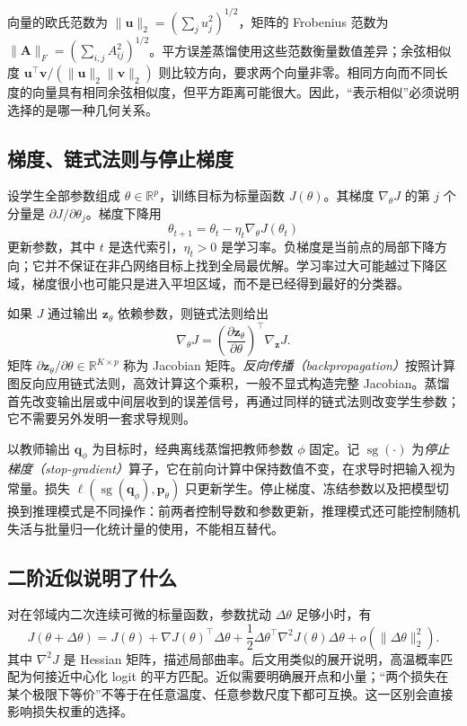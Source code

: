 \documentclass[UTF8,12pt,a4paper,fontset=fandol]{ctexart}
\begin{document}
向量的欧氏范数为 $\|\mathbf u\|_2=(\sum_j u_j^2)^{1/2}$，矩阵的 Frobenius 范数为 $\|\mathbf A\|_F=(\sum_{i,j}A_{ij}^2)^{1/2}$。平方误差蒸馏使用这些范数衡量数值差异；余弦相似度 $\mathbf u^\top\mathbf v/(\|\mathbf u\|_2\|\mathbf v\|_2)$ 则比较方向，要求两个向量非零。相同方向而不同长度的向量具有相同余弦相似度，但平方距离可能很大。因此，“表示相似”必须说明选择的是哪一种几何关系。

\subsection{梯度、链式法则与停止梯度}
设学生全部参数组成 $\theta\in\mathbb R^p$，训练目标为标量函数 $J(\theta)$。其梯度 $\nabla_\theta J$ 的第 $j$ 个分量是 $\partial J/\partial\theta_j$。梯度下降用
\begin{equation}
  \theta_{t+1}=\theta_t-\eta_t\nabla_\theta J(\theta_t)
  \label{eq:kd-gradient-descent}
\end{equation}
更新参数，其中 $t$ 是迭代索引，$\eta_t>0$ 是学习率。负梯度是当前点的局部下降方向；它并不保证在非凸网络目标上找到全局最优解。学习率过大可能越过下降区域，梯度很小也可能只是进入平坦区域，而不是已经得到最好的分类器。

如果 $J$ 通过输出 $\mathbf z_\theta$ 依赖参数，则链式法则给出
\begin{equation}
  \nabla_\theta J
  =\left(\frac{\partial\mathbf z_\theta}{\partial\theta}\right)^\top
    \nabla_{\mathbf z}J.
  \label{eq:kd-chain}
\end{equation}
矩阵 $\partial\mathbf z_\theta/\partial\theta\in\mathbb R^{K\times p}$ 称为 Jacobian 矩阵。\emph{反向传播（backpropagation）}按照计算图反向应用链式法则，高效计算这个乘积，一般不显式构造完整 Jacobian。蒸馏首先改变输出层或中间层收到的误差信号，再通过同样的链式法则改变学生参数；它不需要另外发明一套求导规则。

以教师输出 $\mathbf q_\phi$ 为目标时，经典离线蒸馏把教师参数 $\phi$ 固定。记 $\operatorname{sg}(\cdot)$ 为\emph{停止梯度（stop-gradient）}算子，它在前向计算中保持数值不变，在求导时把输入视为常量。损失 $\ell(\operatorname{sg}(\mathbf q_\phi),\mathbf p_\theta)$ 只更新学生。停止梯度、冻结参数以及把模型切换到推理模式是不同操作：前两者控制导数和参数更新，推理模式还可能控制随机失活与批量归一化统计量的使用，不能相互替代。

\subsection{二阶近似说明了什么}
对在邻域内二次连续可微的标量函数，参数扰动 $\Delta\theta$ 足够小时，有
\[
 J(\theta+\Delta\theta)=J(\theta)+\nabla J(\theta)^\top\Delta\theta
 +\frac12\Delta\theta^\top\nabla^2J(\theta)\Delta\theta
 +o(\|\Delta\theta\|_2^2).
\]
其中 $\nabla^2J$ 是 Hessian 矩阵，描述局部曲率。后文用类似的展开说明，高温概率匹配为何接近中心化 logit 的平方匹配。近似需要明确展开点和小量；“两个损失在某个极限下等价”不等于在任意温度、任意参数尺度下都可互换。这一区别会直接影响损失权重的选择。
\end{document}
